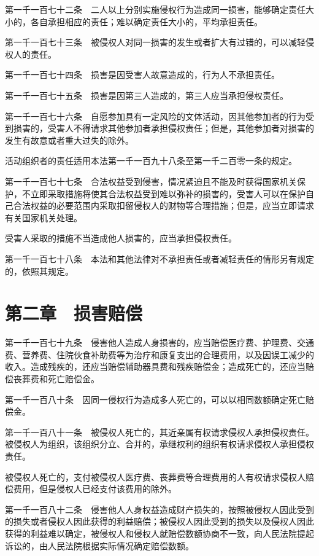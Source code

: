 \documentclass[UTF8,12pt,a4paper]{ctexbook}
\begin{document}
第一千一百七十二条　二人以上分别实施侵权行为造成同一损害，能够确定责任大小的，各自承担相应的责任；难以确定责任大小的，平均承担责任。

第一千一百七十三条　被侵权人对同一损害的发生或者扩大有过错的，可以减轻侵权人的责任。

第一千一百七十四条　损害是因受害人故意造成的，行为人不承担责任。

第一千一百七十五条　损害是因第三人造成的，第三人应当承担侵权责任。

第一千一百七十六条　自愿参加具有一定风险的文体活动，因其他参加者的行为受到损害的，受害人不得请求其他参加者承担侵权责任；但是，其他参加者对损害的发生有故意或者重大过失的除外。

活动组织者的责任适用本法第一千一百九十八条至第一千二百零一条的规定。

第一千一百七十七条　合法权益受到侵害，情况紧迫且不能及时获得国家机关保护，不立即采取措施将使其合法权益受到难以弥补的损害的，受害人可以在保护自己合法权益的必要范围内采取扣留侵权人的财物等合理措施；但是，应当立即请求有关国家机关处理。

受害人采取的措施不当造成他人损害的，应当承担侵权责任。

第一千一百七十八条　本法和其他法律对不承担责任或者减轻责任的情形另有规定的，依照其规定。

\section*{第二章　损害赔偿}

第一千一百七十九条　侵害他人造成人身损害的，应当赔偿医疗费、护理费、交通费、营养费、住院伙食补助费等为治疗和康复支出的合理费用，以及因误工减少的收入。造成残疾的，还应当赔偿辅助器具费和残疾赔偿金；造成死亡的，还应当赔偿丧葬费和死亡赔偿金。

第一千一百八十条　因同一侵权行为造成多人死亡的，可以以相同数额确定死亡赔偿金。

第一千一百八十一条　被侵权人死亡的，其近亲属有权请求侵权人承担侵权责任。被侵权人为组织，该组织分立、合并的，承继权利的组织有权请求侵权人承担侵权责任。

被侵权人死亡的，支付被侵权人医疗费、丧葬费等合理费用的人有权请求侵权人赔偿费用，但是侵权人已经支付该费用的除外。

第一千一百八十二条　侵害他人人身权益造成财产损失的，按照被侵权人因此受到的损失或者侵权人因此获得的利益赔偿；被侵权人因此受到的损失以及侵权人因此获得的利益难以确定，被侵权人和侵权人就赔偿数额协商不一致，向人民法院提起诉讼的，由人民法院根据实际情况确定赔偿数额。
\end{document}
